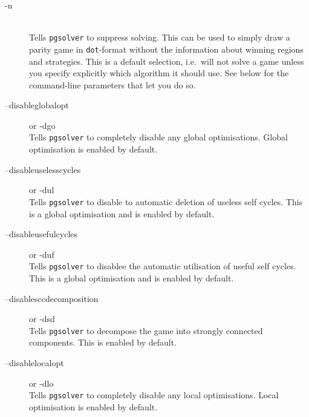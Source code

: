 \begin{description}


\item[{\ttfamily -n}] \ \\
   Tells \texttt{pgsolver} to suppress solving. This can be used to simply draw a parity game in
   \texttt{dot}-format without the information about winning regions and strategies. This is a default
   selection, i.e.\ \pgsolver will not solve a game unless you specify explicitly which algorithm it
   should use. See below for the command-line parameters that let you do so.

\item[{\ttfamily --disableglobalopt}]  \enspace or {\ttfamily -dgo} \\
   Tells \texttt{pgsolver} to completely disable any global optimisations. Global optimisation is enabled by default.

\item[{\ttfamily --disableuselesscycles}]  \enspace or {\ttfamily -dul} \\
   Tells \texttt{pgsolver} to disable to automatic deletion of useless self cycles. This is a global optimisation and is enabled by default.

\item[{\ttfamily --disableusefulcycles}]  \enspace or {\ttfamily -duf} \\
   Tells \texttt{pgsolver} to disablee the automatic utilisation of useful self cycles. This is a global optimisation and is enabled by default.

\item[{\ttfamily --disablesccdecomposition}]  \enspace or {\ttfamily -dsd} \\
   Tells \texttt{pgsolver} to decompose the game into strongly connected components. This is enabled by default.

\item[{\ttfamily --disablelocalopt}]  \enspace or {\ttfamily -dlo} \\
   Tells \texttt{pgsolver} to completely disable any local optimisations. Local optimisation is enabled by default.


\end{description}
